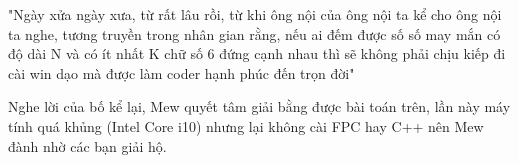 "Ngày xửa ngày xưa, từ rất lâu rồi, từ khi ông nội của ông nội ta kể cho ông nội ta nghe, tương truyền trong nhân gian rằng, nếu ai đếm được số số may mắn có độ dài N và có ít nhất K chữ số 6 đứng cạnh nhau thì sẽ không phải chịu kiếp đi cài win dạo mà được làm coder hạnh phúc đến trọn đời"

Nghe lời của bố kể lại, Mew quyết tâm giải bằng được bài toán trên, lần này máy tính quá khủng (Intel Core i10) nhưng lại không cài FPC hay C++ nên Mew đành nhờ các bạn giải hộ.